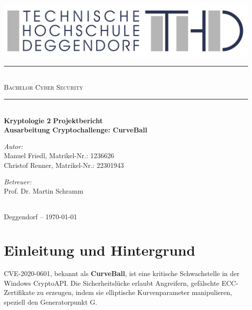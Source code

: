 \documentclass{article}
\begin{document}
\begin{titlepage}
  \begin{center}
    \includegraphics[width=\textwidth]{THD-Logo.pdf}
    \vspace{1cm}
    \rule{1\textwidth}{1mm} \\[0.3cm]
    \textsc{\scshape \huge Bachelor Cyber Security}\\
    \rule{1\textwidth}{1mm} \\[2cm]
    {
      \vspace{1cm}
      \Large \textbf{Kryptologie 2}
      \vspace{3cm}
      \Large \textbf{Projektbericht}
    }\\[0.5cm]
    \LARGE \textbf{Ausarbeitung Cryptochallenge: CurveBall}\\[2cm]
    \begin{minipage}[t]{0.4\textwidth}
      \begin{flushleft}
        \normalsize \emph{Autor:}\\[0.3cm]
        Manuel Friedl, Matrikel-Nr.: 1236626\\
        Christof Renner, Matrikel-Nr.: 22301943
      \end{flushleft}
    \end{minipage}
    \begin{minipage}[t]{0.5\textwidth}
      \begin{flushright}
        \normalsize \emph{Betreuer:}\\[0.3cm]
        Prof. Dr. Martin Schramm
      \end{flushright}
    \end{minipage}\\[3cm]
    {\large Deggendorf – \today\\}
  \end{center}
\end{titlepage}

\newpage
{}

\newpage
\tableofcontents
\newpage


\section{Einleitung und Hintergrund}
CVE-2020-0601, bekannt als \textbf{CurveBall}, ist eine kritische Schwachstelle in der Windows CryptoAPI. Die Sicherheitslücke erlaubt Angreifern, gefälschte ECC-Zertifikate zu erzeugen, indem sie elliptische Kurvenparameter manipulieren, speziell den Generatorpunkt G.
\end{document}
